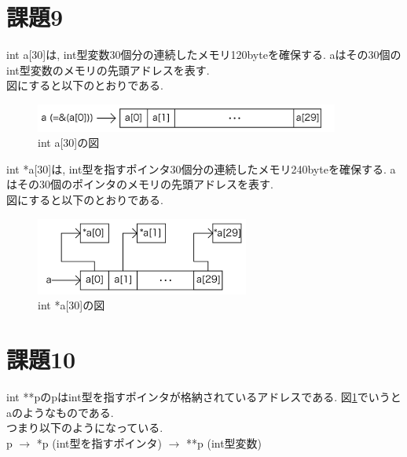 \documentclass[dvipdfmx]{jsarticle}
\begin{document}
\section*{課題9}
int a[30]は, int型変数30個分の連続したメモリ120byteを確保する.
aはその30個のint型変数のメモリの先頭アドレスを表す. \\
図にすると以下のとおりである. 
\begin{figure}[H]
\centering
\includegraphics[width=10cm]{./a30.png}
\caption{int a{[}30{]}の図}
\end{figure}
int *a[30]は, int型を指すポインタ30個分の連続したメモリ240byteを確保する. 
aはその30個のポインタのメモリの先頭アドレスを表す. \\
図にすると以下のとおりである. 
\begin{figure}[H]
\centering
\includegraphics[width=7cm]{./pa30.png}
\caption{int *a{[}30{]}の図 \label{pa30}}
\end{figure}
\section*{課題10}
int **pのpはint型を指すポインタが格納されているアドレスである. 
図\ref{pa30}でいうとaのようなものである. \\
つまり以下のようになっている. \\
p $\rightarrow$ *p (int型を指すポインタ) $\rightarrow$ **p (int型変数)
\end{document}
